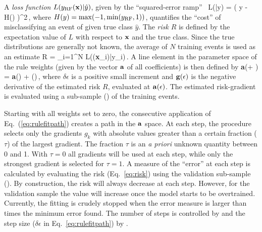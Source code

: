 A {\em loss function} $L( y_{\rm RF}({\bf x})|\hat y)$, given by the ``squared-error 
ramp''~\cite{RuleFitMin} 
\beq
   L(\yRF|\hat y) = \left( \hat y - H(\yRF) \right)^2\,,
\eeq
where $H(y) = \max(-1,\min( y_{\rm RF},1))$, quantifies the ``cost'' of misclassifying
 an event of given true class $\hat y$. The {\em risk} 
$R$ is defined by the expectation value of $L$ with respect to ${\bf x}$ and 
the true class. Since the true distributions are generally not known, the average 
of $N$ training events is used as an estimate
\beq
   R = \sum_{i=1}^{N} L(\yRF({\bf x}_i)|\hat y_i)\,.
\label{eq:risk}
\eeq
A line element in the parameter space of the rule weights (given by the vector ${\bf a}$ 
of all coefficients) is then defined by
\beq
\label{eq:rulefitpath}
{\bf a}(\epsilon + \delta \epsilon) = {\bf a}(\epsilon) + \delta \epsilon {}(\epsilon)\,,
\eeq
where $\delta \epsilon$ is a positive small increment and ${\bf
  g}(\epsilon)$ is the negative derivative of the estimated risk $R$,
evaluated at ${\bf a}(\epsilon)$.  The estimated risk-gradient is evaluated
using a sub-sample () of the training events.

Starting with all weights set to zero, the consecutive application of 
Eq.~(\ref{eq:rulefitpath}) creates a path in the ${\bf a}$ space.
At each step, the procedure selects only the gradients $g_k$
with absolute values greater than a certain fraction ($\tau$) of the largest
gradient. The fraction $\tau$ is an {\em a priori} unknown quantity between 0 and 1.
With $\tau=0$ all gradients will be used at each step, while
only the strongest gradient is selected for $\tau=1$.
A measure of the ``error'' at each step is calculated by evaluating the risk 
(Eq.~\ref{eq:risk}) using the validation sub-sample (). 
By construction, the risk will always decrease at each step. However, for the 
validation sample the value will increase once the model starts to be overtrained.
Currently, the fitting is crudely stopped when the error measure is larger than 
 times the minimum error found.
The number of steps is controlled by  and the step size ($\delta \epsilon$ in Eq.~\ref{eq:rulefitpath}) by .

